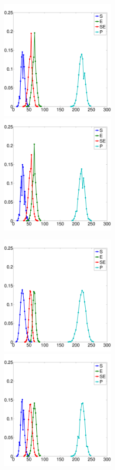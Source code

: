 \documentclass[ugrad,lot,lof,openright,11pt,oneside,onehalfspace]{RUthesis}
\begin{document}
		\begin{figure}[H]
		\centerline{
			\includegraphics[width=0.5\textwidth]{figures/MM_ssa_hist.pdf}
			\includegraphics[width=0.5\textwidth]{figures/MM_tau_hist.pdf}
			}
		\centerline{
			\includegraphics[width=0.5\textwidth]{figures/MM_cle_hist.pdf}
			\includegraphics[width=0.5\textwidth]{figures/MM_gpu_hist.pdf}
}
\end{figure}
\end{document}
